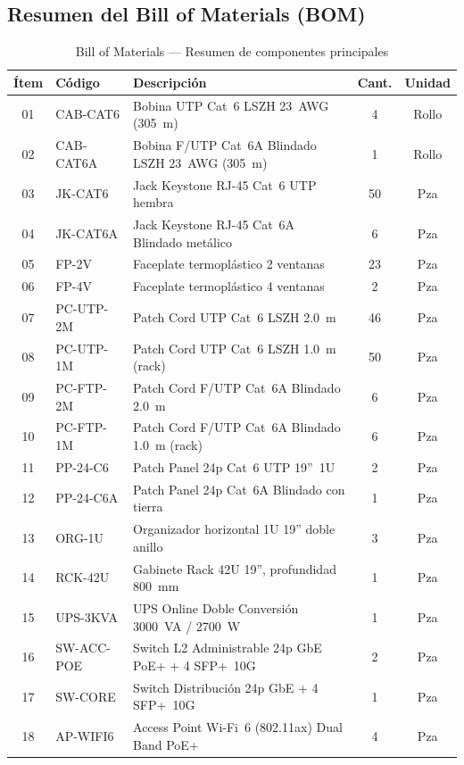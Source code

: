 \subsection{Resumen del Bill of Materials (BOM)}

\begin{table}[H]
\centering
\caption{Bill of Materials --- Resumen de componentes principales}
\small
\begin{tabularx}{\textwidth}{@{}clXcc@{}}
\toprule
\textbf{Ítem} & \textbf{Código} & \textbf{Descripción} & \textbf{Cant.} & \textbf{Unidad} \\
\midrule
01 & CAB-CAT6   & Bobina UTP Cat~6 LSZH 23~AWG (305~m)               & 4  & Rollo \\
02 & CAB-CAT6A  & Bobina F/UTP Cat~6A Blindado LSZH 23~AWG (305~m)   & 1  & Rollo \\
03 & JK-CAT6    & Jack Keystone RJ-45 Cat~6 UTP hembra               & 50 & Pza   \\
04 & JK-CAT6A   & Jack Keystone RJ-45 Cat~6A Blindado metálico        & 6  & Pza   \\
05 & FP-2V      & Faceplate termoplástico 2 ventanas                  & 23 & Pza   \\
06 & FP-4V      & Faceplate termoplástico 4 ventanas                  & 2  & Pza   \\
07 & PC-UTP-2M  & Patch Cord UTP Cat~6 LSZH 2.0~m                    & 46 & Pza   \\
08 & PC-UTP-1M  & Patch Cord UTP Cat~6 LSZH 1.0~m (rack)             & 50 & Pza   \\
09 & PC-FTP-2M  & Patch Cord F/UTP Cat~6A Blindado 2.0~m             & 6  & Pza   \\
10 & PC-FTP-1M  & Patch Cord F/UTP Cat~6A Blindado 1.0~m (rack)      & 6  & Pza   \\
11 & PP-24-C6   & Patch Panel 24p Cat~6 UTP 19''~1U                  & 2  & Pza   \\
12 & PP-24-C6A  & Patch Panel 24p Cat~6A Blindado con tierra          & 1  & Pza   \\
13 & ORG-1U     & Organizador horizontal 1U 19'' doble anillo         & 3  & Pza   \\
14 & RCK-42U    & Gabinete Rack 42U 19'', profundidad 800~mm          & 1  & Pza   \\
15 & UPS-3KVA   & UPS Online Doble Conversión 3000~VA / 2700~W        & 1  & Pza   \\
16 & SW-ACC-POE & Switch L2 Administrable 24p GbE PoE+ + 4 SFP+~10G  & 2  & Pza   \\
17 & SW-CORE    & Switch Distribución 24p GbE + 4 SFP+~10G           & 1  & Pza   \\
18 & AP-WIFI6   & Access Point Wi-Fi~6 (802.11ax) Dual Band PoE+     & 4  & Pza   \\
\bottomrule
\end{tabularx}
\label{tab:bom}
\end{table}
